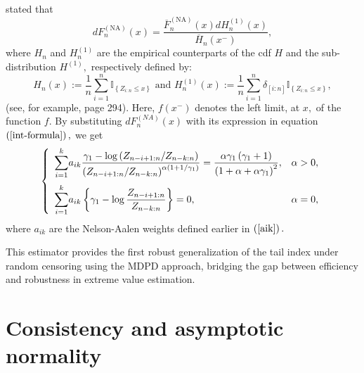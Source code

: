 \documentclass[reqno,openbib,runningheads,a4paper,12pt]{amsart}%
\begin{document}
\cite{MNS2025} stated that
\begin{equation}
dF_{n}^{\left(  \mathrm{NA}\right)  }\left(  x\right)  =\frac{\overline{F}%
_{n}^{\left(  \mathrm{NA}\right)  }\left(  x\right)  dH_{n}^{\left(  1\right)
}\left(  x\right)  }{\overline{H}_{n}\left(  x^{-}\right)  },\label{dFn}%
\end{equation}
where $H_{n}$ and $H_{n}^{\left(  1\right)  }$ are the empirical counterparts
of the cdf $H$ and the sub-distribution $H^{\left(  1\right)  },$ respectively
defined by:%
\[
H_{n}\left(  x\right)  :=\frac{1}{n}\sum_{i=1}^{n}\mathbb{I}_{\left\{
Z_{i:n}\leq x\right\}  }\text{ and }H_{n}^{\left(  1\right)  }\left(
x\right)  :=\frac{1}{n}\sum_{i=1}^{n}\delta_{\left[  i:n\right]  }%
\mathbb{I}_{\left\{  Z_{i:n}\leq x\right\}  },
\]
(see, for example, \cite{SW86} page 294). Here, $f\left(  x^{-}\right)  $
denotes the left limit, at $x,$ of the function $f.$ By substituting
$dF_{n}^{\left(  NA\right)  }\left(  x\right)  $ with its expression in
equation $\left(  \ref{int-formula}\right)  ,$ we get%
\begin{equation}
\left\{
\begin{array}
[c]{lc}%
{\displaystyle\sum\limits_{i=1}^{k}}
a_{ik}\dfrac{\gamma_{1}-\log\left(  Z_{n-i+1:n}/Z_{n-k:n}\right)  }{\left(
Z_{n-i+1:n}/Z_{n-k:n}\right)  ^{\alpha\left(  1+1/\gamma_{1}\right)  }}%
=\dfrac{\alpha\gamma_{1}\left(  \gamma_{1}+1\right)  }{\left(  1+\alpha
+\alpha\gamma_{1}\right)  ^{2}}, & \alpha>0,\medskip\\%
{\displaystyle\sum\limits_{i=1}^{k}}
a_{ik}\left\{  \gamma_{1}-\log\dfrac{Z_{n-i+1:n}}{Z_{n-k:n}}\right\}  =0, &
\alpha=0,
\end{array}
\right.  \label{estim-equa}%
\end{equation}
where $a_{ik}$ are the Nelson-Aalen weights defined earlier in $\left(
\ref{aik}\right)  .$ \smallskip

\noindent This estimator provides the first robust generalization of the tail
index under random censoring using the MDPD approach, bridging the gap between
efficiency and robustness in extreme value estimation.

\section{\textbf{Consistency and asymptotic normality\label{sec3}}}
\end{document}
